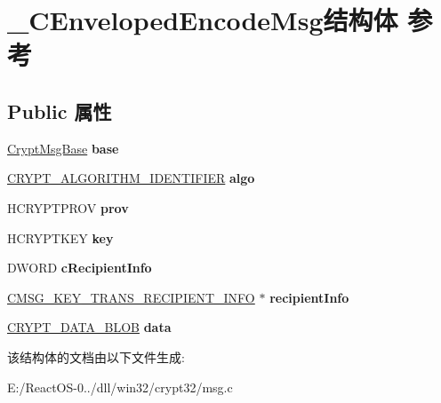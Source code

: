 \hypertarget{struct___c_enveloped_encode_msg}{}\section{\+\_\+\+C\+Enveloped\+Encode\+Msg结构体 参考}
\label{struct___c_enveloped_encode_msg}
\subsection*{Public 属性}
\begin{DoxyCompactItemize}
\item 
\mbox{\label{struct___c_enveloped_encode_msg_a6d5482bcb3faba61f5cfe732dedc1473}} 
\hyperlink{struct___crypt_msg_base}{Crypt\+Msg\+Base} {\bfseries base}
\item 
\mbox{\label{struct___c_enveloped_encode_msg_afec0058ca45dd70fc51e232503bc18a4}} 
\hyperlink{struct___c_r_y_p_t___a_l_g_o_r_i_t_h_m___i_d_e_n_t_i_f_i_e_r}{C\+R\+Y\+P\+T\+\_\+\+A\+L\+G\+O\+R\+I\+T\+H\+M\+\_\+\+I\+D\+E\+N\+T\+I\+F\+I\+ER} {\bfseries algo}
\item 
\mbox{\label{struct___c_enveloped_encode_msg_a3326516db5ffe69390d8d5efb204ad7f}} 
H\+C\+R\+Y\+P\+T\+P\+R\+OV {\bfseries prov}
\item 
\mbox{\label{struct___c_enveloped_encode_msg_a45e9534faba484d48e932363c93c9ded}} 
H\+C\+R\+Y\+P\+T\+K\+EY {\bfseries key}
\item 
\mbox{\label{struct___c_enveloped_encode_msg_a3d0b53014098c5ac5ffc600cccdfb221}} 
D\+W\+O\+RD {\bfseries c\+Recipient\+Info}
\item 
\mbox{\label{struct___c_enveloped_encode_msg_aab821256e3bb84dd856503d50d1ea5fb}} 
\hyperlink{struct___c_m_s_g___k_e_y___t_r_a_n_s___r_e_c_i_p_i_e_n_t___i_n_f_o}{C\+M\+S\+G\+\_\+\+K\+E\+Y\+\_\+\+T\+R\+A\+N\+S\+\_\+\+R\+E\+C\+I\+P\+I\+E\+N\+T\+\_\+\+I\+N\+FO} $\ast$ {\bfseries recipient\+Info}
\item 
\mbox{\label{struct___c_enveloped_encode_msg_a7dce75a4d15f4803e5d1e0951f5f6f67}} 
\hyperlink{struct___c_r_y_p_t_o_a_p_i___b_l_o_b}{C\+R\+Y\+P\+T\+\_\+\+D\+A\+T\+A\+\_\+\+B\+L\+OB} {\bfseries data}
\end{DoxyCompactItemize}


该结构体的文档由以下文件生成\+:\begin{DoxyCompactItemize}
\item 
E\+:/\+React\+O\+S-\/0../dll/win32/crypt32/msg.\+c\end{DoxyCompactItemize}
